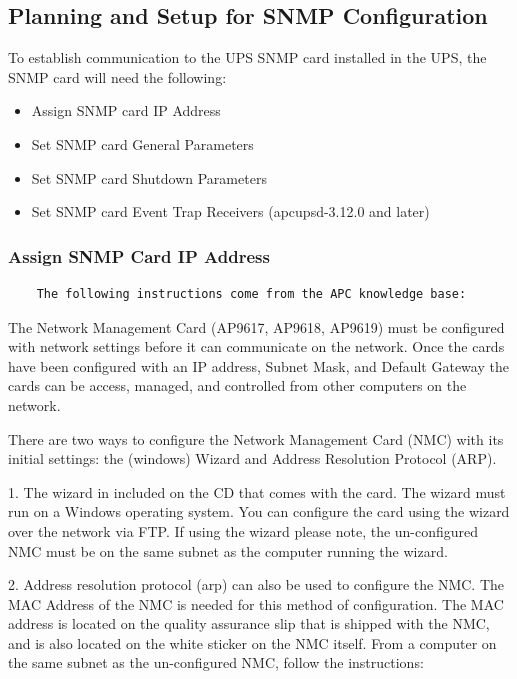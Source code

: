 {{{{{{{\subsection*{Planning and Setup for SNMP Configuration}
To establish communication to the UPS SNMP card installed in the UPS, the
SNMP card will need the following:
\begin{itemize}
\item Assign SNMP card IP Address
\item Set SNMP card General Parameters
\item Set SNMP card Shutdown Parameters
\item Set SNMP card Event Trap Receivers (apcupsd-3.12.0 and later)
\end{itemize}

\subsubsection*{Assign SNMP Card IP Address}
\footnotesize
\begin{verbatim}
  	The following instructions come from the APC knowledge base:   
\end{verbatim}

\normalsize
The Network Management Card (AP9617, AP9618, AP9619) must be configured with
network settings before it can communicate on the network. Once the cards have been
configured with an IP address, Subnet Mask, and Default Gateway the cards can be
access, managed, and controlled from other computers on the network.

There are two ways to configure the Network Management Card (NMC) with its
initial settings: the (windows) Wizard and Address Resolution Protocol (ARP).

1.  The wizard in included on the CD that comes with the card.  The wizard must
run on a Windows operating system.  You can configure the card using the wizard over
the network via FTP.  If using the wizard please note, the un-configured NMC must
be on the same subnet as the computer running the wizard.

2.  Address resolution protocol (arp) can also be used to configure the NMC.  The MAC
Address of the NMC is needed for this method of configuration.  The MAC address is
located on the quality assurance slip that is shipped with the NMC, and is also
located on the white sticker on the NMC itself.  From a computer on the same
subnet as the un-configured NMC, follow the instructions:

}}}}}}}
